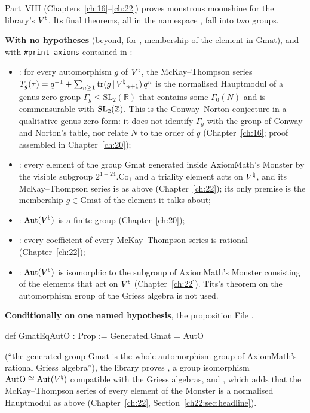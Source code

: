 Part~VIII (Chapters~\ref{ch:16}--\ref{ch:22}) proves monstrous moonshine for the library's ${V^{\natural}}$. Its final
theorems, all in the namespace , fall into two groups.

\textbf{With no hypotheses} (beyond, for , membership of the element in $\mathrm{Gmat}$), and with \texttt{\#print axioms} contained in :
\begin{itemize}
\item {}: for every automorphism $g$ of ${V^{\natural}}$, the McKay--Thompson series
  $T_g(\tau)=q^{-1}+\sum_{n\ge1}\operatorname{tr}(g\,|\,{V^{\natural}}_{n+1})\,q^n$ is the normalised Hauptmodul of a genus-zero group
  $\Gamma_g\le\mathrm{SL}_2(\mathbb R)$ that contains some $\Gamma_0(N)$ and is commensurable with
  $\mathrm{SL}_2({\mathbb{Z}})$. This is the Conway--Norton conjecture in a qualitative genus-zero form: it does not identify
  $\Gamma_g$ with the group of Conway and Norton's table, nor relate $N$ to the order of $g$
  (Chapter~\ref{ch:16}; proof assembled in Chapter~\ref{ch:20});
\item {}: every element of the group $\mathrm{Gmat}$ generated inside AxiomMath's Monster by the
  visible subgroup $2^{1+24}.\mathrm{Co}_1$ and a triality element acts on ${V^{\natural}}$, and its McKay--Thompson series is as
  above (Chapter~\ref{ch:22}); its only premise is the membership $g\in\mathrm{Gmat}$ of the element it talks about;
\item {}: $\operatorname{Aut}({V^{\natural}})$ is a finite group (Chapter~\ref{ch:20});
\item {}: every coefficient of every McKay--Thompson series is rational (Chapter~\ref{ch:22});
\item {}: $\operatorname{Aut}({V^{\natural}})$ is isomorphic to the subgroup of AxiomMath's Monster
   consisting of the elements that act on ${V^{\natural}}$ (Chapter~\ref{ch:22}). Tits's theorem on the automorphism
  group of the Griess algebra is not used.
\end{itemize}

\textbf{Conditionally on one named hypothesis}, the proposition
\noindent File .
\begin{leancode}
def GmatEqAutO : Prop :=
  Generated.Gmat = AutO
\end{leancode}
(``the generated group $\mathrm{Gmat}$ is the whole automorphism group  of AxiomMath's rational Griess
algebra''), the library proves , a group isomorphism
$\mathrm{AutO}\cong\operatorname{Aut}({V^{\natural}})$ compatible with the Griess algebras, and ,
which adds that the McKay--Thompson series of every element of the Monster is a normalised Hauptmodul as above
(Chapter~\ref{ch:22}, Section~\ref{ch22:sec:headline}).


